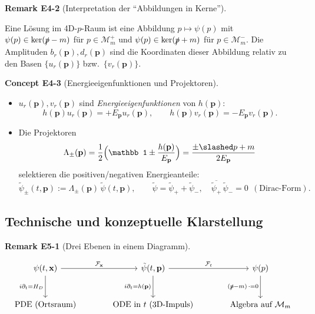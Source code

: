 \documentclass[10pt, letterpaper]{article}
\newcommand{\CustomHeading}[3]{%
  \par\medskip\noindent%
  \textbf{#1 #2} \textnormal{(#3)}.\enskip%
}
\newenvironment{REM}[2]{\begin{unitbox}\CustomHeading{Remark}{#1}{#2}}{\end{unitbox}}
\newenvironment{CONC}[2]{\begin{unitbox}\CustomHeading{Concept}{#1}{#2}}{\end{unitbox}}
\begin{document}
\begin{REM}{E4-2}{Interpretation der ``Abbildungen in Kerne''}
Eine Lösung im 4D-$p$-Raum ist eine Abbildung $p\mapsto \psi(p)$ mit $\psi(p)\in\ker(\slashed p-m)$ für $p\in\mathcal M_m^+$ und $\psi(p)\in\ker(\slashed p+m)$ für $p\in\mathcal M_m^-$.  
Die Amplituden $b_r(\mathbf p),d_r(\mathbf p)$ sind die Koordinaten dieser Abbildung relativ zu den Basen $\{u_r(\mathbf p)\}$ bzw.\ $\{v_r(\mathbf p)\}$.
\end{REM}

\begin{CONC}{E4-3}{Energieeigenfunktionen und Projektoren}
\begin{itemize}
\item $u_r(\mathbf p),v_r(\mathbf p)$ sind \emph{Energieeigenfunktionen} von $h(\mathbf p)$:
\[
h(\mathbf p)u_r(\mathbf p)=+E_{\mathbf p}u_r(\mathbf p),\qquad
h(\mathbf p)v_r(\mathbf p)=-E_{\mathbf p}v_r(\mathbf p).
\]
\item Die Projektoren
\[
\Lambda_\pm(\mathbf p)=\frac{1}{2}\Big(\mathbb 1\pm \frac{h(\mathbf p)}{E_{\mathbf p}}\Big)
=\frac{\pm\slashed p + m}{2E_{\mathbf p}}
\]
selektieren die positiven/negativen Energieanteile:
\[
\tilde\psi_\pm(t,\mathbf p):=\Lambda_\pm(\mathbf p)\,\tilde\psi(t,\mathbf p),\qquad
\tilde\psi=\tilde\psi_++\tilde\psi_-,
\quad \overline{\tilde\psi_+}\,\tilde\psi_-=0\ \ (\text{Dirac-Form}).
\]
\end{itemize}
\end{CONC}

\subsection{Technische und konzeptuelle Klarstellung}

\begin{REM}{E5-1}{Drei Ebenen in einem Diagramm}
\[
\begin{tikzcd}[column sep=large,row sep=large]
\psi(t,\mathbf x)\ar[r, "\mathcal F_{\mathbf x}"]
\ar[d, "i\partial_t=H_D" left]
& \tilde\psi(t,\mathbf p)\ar[r, "\mathcal F_t"]\ar[d, "i\partial_t=h(\mathbf p)" left]
& \psi(p)\ar[d, "(\slashed p-m)\,\cdot=0" left]\\
\text{PDE (Ortsraum)} & \text{ODE in $t$ (3D-Impuls)} & \text{Algebra auf $\mathcal M_m$}
\end{tikzcd}
\]
\end{REM}
\end{document}
